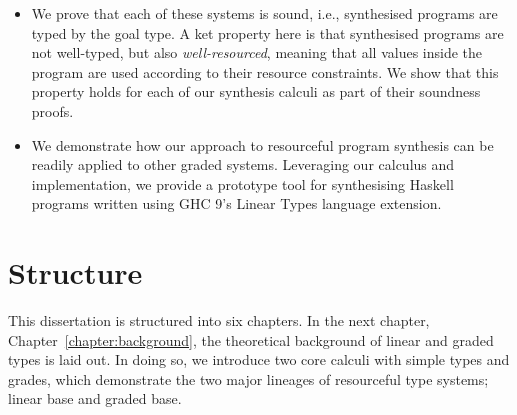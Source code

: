 \begin{itemize}
  \item We prove that each of these systems is sound, i.e., synthesised programs
        are typed by the goal type. A ket property here is that synthesised programs 
        are not well-typed, but also \emph{well-resourced}, meaning that all values  
        inside the program are used according to their resource constraints. We
        show that this property holds for each of our synthesis calculi as part
        of their soundness proofs. 

  \item We demonstrate how our approach to resourceful program synthesis can be
        readily applied to other graded systems. Leveraging our calculus and
        implementation, we provide a prototype tool for synthesising Haskell
        programs written using GHC 9's Linear Types language extension.
\end{itemize}
\section{Structure}

This dissertation is structured into six chapters. In the next chapter,
Chapter~\ref{chapter:background}, the theoretical background of linear and
graded types is laid out. In doing so, we introduce two core calculi with simple
types and grades, which demonstrate the two major lineages of resourceful type
systems; linear base and graded base.


